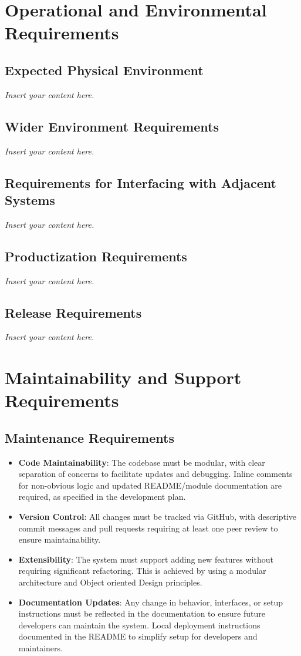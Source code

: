\documentclass[12pt]{article}
\newcommand{\lips}{\textit{Insert your content here.}}
\begin{document}
\section{Operational and Environmental Requirements}
\subsection{Expected Physical Environment}
\lips
\subsection{Wider Environment Requirements}
\lips
\subsection{Requirements for Interfacing with Adjacent Systems}
\lips
\subsection{Productization Requirements}
\lips
\subsection{Release Requirements}
\lips

\section{Maintainability and Support Requirements}
\subsection{Maintenance Requirements}

\begin{itemize}
    \item \textbf{Code Maintainability}: The codebase must be modular, with clear separation of concerns to facilitate updates and debugging. Inline comments for non-obvious logic and updated README/module documentation are required, as specified in the development plan.
    \item \textbf{Version Control}: All changes must be tracked via GitHub, with descriptive commit messages and pull requests requiring at least one peer review to ensure maintainability.
    \item \textbf{Extensibility}: The system must support adding new features without requiring significant refactoring. This is achieved by using a modular architecture and Object oriented Design principles.
    \item \textbf{Documentation Updates}: Any change in behavior, interfaces, or setup instructions must be reflected in the documentation to ensure future developers can maintain the system. Local deployment instructions documented in the README to simplify setup for developers and maintainers.
\end{itemize}
\end{document}
